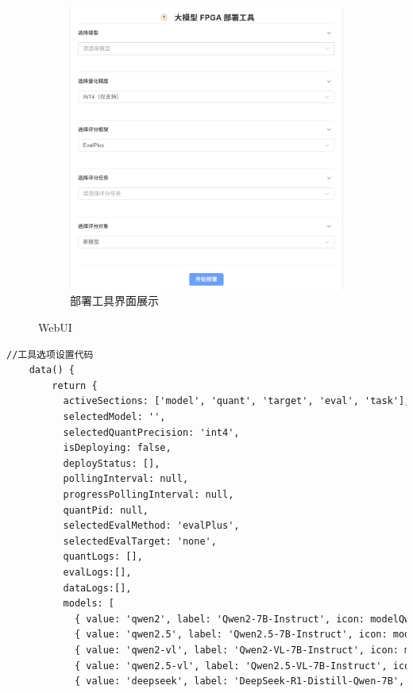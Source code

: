 \documentclass[AutoFakeBold,AutoFakeSlant,language=chinese,degree=bachelor]{sustechthesis}
\begin{document}
\begin{itemize}
\begin{figure}[htb]
\begin{subfigure}[t]{.2\textwidth}
                \centering
                \includegraphics[width=\textwidth]{./figures/deploymenttool_display.png}
                \caption{部署工具界面展示}
            \end{subfigure}
            \caption{WebUI}
        \end{figure}
        \begin{lstlisting}[language=HTML]
        //工具选项设置代码
    data() {
        return {
          activeSections: ['model', 'quant', 'target', 'eval', 'task'],
          selectedModel: '',
          selectedQuantPrecision: 'int4',
          isDeploying: false,
          deployStatus: [],
          pollingInterval: null,
          progressPollingInterval: null,
          quantPid: null,
          selectedEvalMethod: 'evalPlus',
          selectedEvalTarget: 'none',
          quantLogs: [],
          evalLogs:[],
          dataLogs:[],
          models: [
            { value: 'qwen2', label: 'Qwen2-7B-Instruct', icon: modelQwen },
            { value: 'qwen2.5', label: 'Qwen2.5-7B-Instruct', icon: modelQwen },
            { value: 'qwen2-vl', label: 'Qwen2-VL-7B-Instruct', icon: modelQwen },
            { value: 'qwen2.5-vl', label: 'Qwen2.5-VL-7B-Instruct', icon: modelQwen },
            { value: 'deepseek', label: 'DeepSeek-R1-Distill-Qwen-7B', icon: modelDeepseek }

\end{lstlisting}
\end{itemize}
\end{document}
